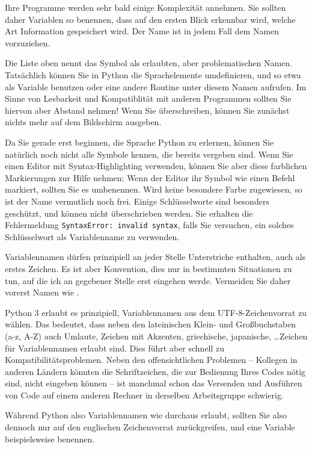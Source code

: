 \begin{hintbox}
Ihre Programme werden sehr bald einige Komplexität annehmen. Sie sollten daher Variablen so benennen, dass auf den ersten Blick erkennbar wird, welche Art Information gespeichert wird. Der Name  ist in jedem Fall dem Namen  vorzuziehen.
\end{hintbox}
%
\begin{hintbox}[Schlüsselworte]
Die Liste oben nennt das Symbol  als erlaubten, aber problematischen Namen. Tatsächlich können Sie in Python die Sprachelemente umdefinieren, und so etwa  als Variable benutzen oder eine andere Routine unter diesem Namen aufrufen. Im Sinne von Lesbarkeit und Kompatiblität mit anderen Programmen sollten Sie hiervon aber Abstand nehmen! Wenn Sie  überschreiben, können Sie zunächst nichts mehr auf dem Bildschirm ausgeben.

Da Sie gerade erst beginnen, die Sprache Python zu erlernen, können Sie natürlich noch nicht alle Symbole kennen, die bereits vergeben sind. Wenn Sie einen Editor mit Syntax-Highlighting verwenden, können Sie aber \idR diese farblichen Markierungen zur Hilfe nehmen: Wenn der Editor ihr Symbol wie einen Befehl markiert, sollten Sie es umbenennen. Wird keine besondere Farbe zugewiesen, so ist der Name vermutlich noch frei. Einige Schlüsselworte sind besonders geschützt, und können nicht überschrieben werden. Sie erhalten die Fehlermeldung \texttt{SyntaxError: invalid syntax}, falls Sie versuchen, ein solches Schlüsselwort als Variablenname zu verwenden.
\end{hintbox}

\begin{hintbox}
Variablennamen dürfen prinzipiell an jeder Stelle Unterstriche enthalten, auch als erstes Zeichen. Es ist aber Konvention, dies nur in bestimmten Situationen zu tun, auf die ich an gegebener Stelle erst eingehen werde. Vermeiden Sie daher vorerst Namen wie .
\end{hintbox}

\begin{hintbox}
Python 3 erlaubt es prinzipiell, Variablennamen aus dem UTF-8-Zeichenvorrat zu wählen. Das bedeutet, dass neben den lateinischen Klein- und Großbuchstaben (a-z, A-Z) auch Umlaute, Zeichen mit Akzenten, griechische, japanische, \ldots Zeichen für Variablennamen erlaubt sind. Dies führt aber schnell zu Kompatibilitätsproblemen. Neben den offensichtlichen Problemen -- Kollegen in anderen Ländern könnten die Schriftzeichen, die zur Bedienung Ihres Codes nötig sind, nicht eingeben können -- ist manchmal schon das Versenden und Ausführen von Code auf einem anderen Rechner in derselben Arbeitsgruppe schwierig.

Während Python also Variablennamen wie  durchaus erlaubt, sollten Sie also dennoch nur auf den englischen Zeichenvorrat zurückgreifen, und eine Variable beispielsweise  benennen.
\end{hintbox}

